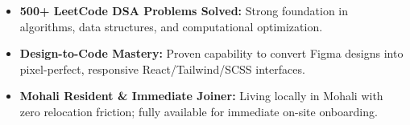 \documentclass[a4paper,10pt]{article}
\begin{document}
\begin{itemize}

    \item \textbf{500+ LeetCode DSA Problems Solved:} Strong foundation in algorithms, data structures, and computational optimization.

    \item \textbf{Design-to-Code Mastery:} Proven capability to convert Figma designs into pixel-perfect, responsive React/Tailwind/SCSS interfaces.

    \item \textbf{Mohali Resident \& Immediate Joiner:} Living locally in Mohali with zero relocation friction; fully available for immediate on-site onboarding.

\end{itemize}

\end{document}
